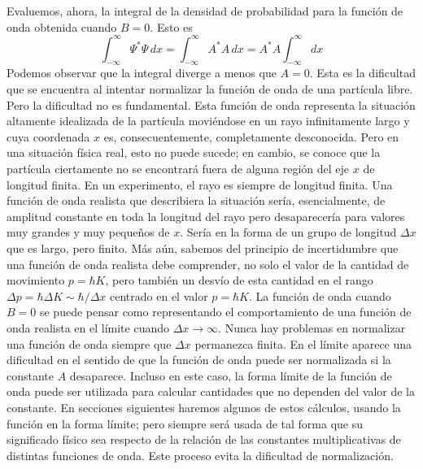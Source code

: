 \documentclass[12pt,a4paper]{article}
\begin{document}
Evaluemos, ahora, la integral de la densidad de probabilidad para la función de onda obtenida cuando $B=0$. Esto es
\[ \int _{-\infty}^{\infty} \Psi ^{\ast}\Psi \, dx=\int _{-\infty}^{\infty}A^{\ast}A \, dx =A^{\ast}A \int _{-\infty}^{\infty} dx \]
Podemos observar que la integral diverge a menos que $A=0$. Esta es la dificultad que se encuentra al intentar normalizar la función de onda de una partícula libre. Pero la dificultad no es fundamental. Esta función de onda representa la situación altamente idealizada de la partícula moviéndose en un rayo infinitamente largo y cuya coordenada $x$ es, consecuentemente, completamente desconocida. Pero en una situación física real, esto no puede sucede; en cambio, se conoce que la partícula ciertamente no se encontrará fuera de alguna región del eje $x$ de longitud finita. En un experimento, el rayo es siempre de longitud finita. Una función de onda realista que describiera la situación sería, esencialmente, de amplitud constante en toda la longitud del rayo pero desaparecería para valores muy grandes y muy pequeños de $x$. Sería en la forma de un grupo de longitud $\Delta x$ que es largo, pero finito. Más aún, sabemos del principio de incertidumbre que una función de onda realista debe comprender, no solo el valor de la cantidad de movimiento $p=\hbar K$, pero también un desvío de esta cantidad en el rango $\Delta p=\hbar \Delta K \sim \hbar/\Delta x$ centrado en el valor $p=\hbar K$. La función de onda cuando $B=0$ se puede pensar como representando el comportamiento de una función de onda realista en el límite cuando $\Delta x \rightarrow \infty$. Nunca hay problemas en normalizar una función de onda siempre que $\Delta x$ permanezca finita. En el límite aparece una dificultad en el sentido de que la función de onda puede ser normalizada si la constante $A$ desaparece. Incluso en este caso, la forma límite de la función de onda puede ser utilizada para calcular cantidades que no dependen del valor de la constante. En secciones siguientes haremos algunos de estos cálculos, usando la función en la forma límite; pero siempre será usada de tal forma que su significado físico sea respecto de la relación de las constantes multiplicativas de distintas funciones de onda. Este proceso evita la dificultad de normalización.
\end{document}
